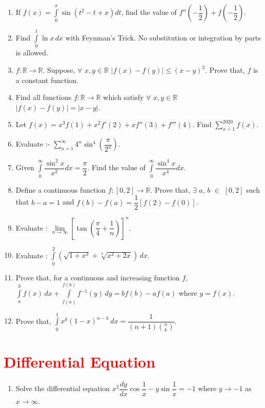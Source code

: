 \documentclass[11pt, a4paper]{article}
\begin{document}
\begin{enumerate}

	\item If $\displaystyle{f(x) = \int \limits_{0}^{x} \sin \left( t^2 - t + x \right) dt}$, find the value of $f''\left( - \dfrac{1}{2} \right) + f \left( - \dfrac{1}{2} \right)$.
	
	\item Find $\displaystyle{\int \limits_{0}^{1} \ln x} \, dx $ with Feynman's Trick. No substitution or integration by parts is allowed.
	
	\item $f : \mathbb{R} \rightarrow \mathbb{R}$. Suppose, $\forall$ $x, y \in \mathbb{R}$ $| f(x) - f(y) | \leq (x-y)^2$. Prove that, $f$ is a constant function.
	
	\item Find all functions $f : \mathbb{R} \rightarrow \mathbb{R}$ which satisfy $\forall$ $x, y \in \mathbb{R}$ $| f(x) - f(y) | = |x-y|$.
	
	\item Let $f(x) = x^3 f(1) + x^2 f'(2) + xf''(3) + f'''(4)$. Find $\sum \limits_{x = 1}^{2020} f(x)$.
	
	\item Evaluate :- $\sum \limits_{n = 1}^{\infty} 4^n \sin^4 \left( \dfrac{\pi}{2^n} \right)$.
	
	\item Given $\displaystyle{\int \limits_{0}^{\infty} \dfrac{\sin^2 x}{x^2} dx = \dfrac{\pi}{2}}$. Find the value of $\displaystyle{\int \limits_{0}^{\infty} \dfrac{\sin^4 x}{x^4} dx}$.
	
	\item Define a continuous function $f:[0,2] \rightarrow \mathbb{R}$. Prove that, $\exists$ $a$, $b$ $\in$ $[0,2]$ such that $b-a = 1$ and $f(b) - f(a) = \dfrac{1}{2}[f(2) - f(0)]$.
	
	\item Evaluate : $\lim \limits_{n \rightarrow \infty} \left[ \tan \left( \dfrac{\pi}{4} + \dfrac{1}{n} \right) \right]^n$.
	
	\item Evaluate : $\displaystyle{\int \limits_{0}^{2}} \left( \sqrt{1+x^3} + \sqrt[3]{x^2 + 2x} \right) \, dx$.
	
	\item Prove that, for a continuous and increasing function $f$, $\displaystyle{\int \limits_{a}^{b} f(x) \, dx + \int \limits_{f(a)}^{f(b)} f^{-1}(y) \, dy = bf(b)- af(a)}$ where $y = f(x)$.
	
	\item Prove that, $\displaystyle{\int \limits_{0}^{1} x^k (1-x)^{n-k} \, dx} = \dfrac{1}{(n+1) \binom{n}{k}}$.
	
\end{enumerate}








\section{\textcolor{red}{Differential Equation}}

\begin{enumerate}

	\item Solve the differential equation $x^2 \dfrac{dy}{dx} \cos \dfrac{1}{x} - y \sin \dfrac{1}{x} = -1$ where $y \rightarrow -1$ as $x \rightarrow \infty$.
\end{enumerate}
\end{document}
